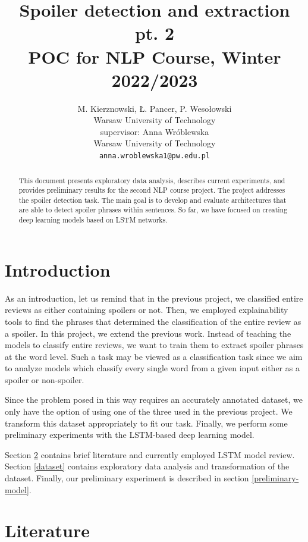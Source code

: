 \documentclass[11pt]{article}
\title{Spoiler detection and extraction pt. 2\\POC for NLP Course, Winter 2022/2023}
\author{M. Kierznowski, Ł. Pancer, P. Wesołowski \\
  Warsaw University of Technology \\
  \And
    supervisor: Anna Wróblewska \\
  Warsaw University of Technology \\
    {\tt anna.wroblewska1@pw.edu.pl}
    }
\date{}
\begin{document}
\maketitle
\begin{abstract}
This document presents exploratory data analysis, describes current experiments, and provides preliminary results for the second NLP course project. The project addresses the spoiler detection task. The main goal is to develop and evaluate architectures that are able to detect spoiler phrases within sentences. So far, we have focused on creating deep learning models based on LSTM networks.
\end{abstract}

\section{Introduction}

As an introduction, let us remind that in the previous project, we classified entire reviews as either containing spoilers or not. Then, we employed explainability tools to find the phrases that determined the classification of the entire review as a spoiler. In this project, we extend the previous work. Instead of teaching the models to classify entire reviews, we want to train them to extract spoiler phrases at the word level. Such a task may be viewed as a classification task since we aim to analyze models which classify every single word from a given input either as a spoiler or non-spoiler.

Since the problem posed in this way requires an accurately annotated dataset, we only have the option of using one of the three used in the previous project. We transform this dataset appropriately to fit our task. Finally, we perform some preliminary experiments with the LSTM-based deep learning model.


Section \ref{literature} contains brief literature and currently employed LSTM model review. Section \ref{dataset} contains exploratory data analysis and transformation of the dataset. Finally, our preliminary experiment is described in section \ref{preliminary-model}.


\section{Literature}
\label{literature}
\end{document}
